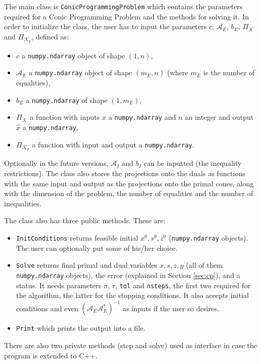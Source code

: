 \documentclass[paper=a4, fontsize=11pt]{scrartcl}
\numberwithin{equation}{section}		%
\numberwithin{figure}{section}			%
\numberwithin{table}{section}				%
\begin{document}
The main class is \texttt{ConicProgrammingProblem} which contains the parameters required for a Conic Programming Problem and the methods for solving it. In order to initialize the class, the user has to input the parameters $c$, $\mathcal{A}_E$, $b_E$, $\Pi_{\mathcal{K}}$ and $\Pi_{\mathcal{K}_p}$, defined as:

\begin{itemize}
\item $c$ a \texttt{numpy.ndarray} object of shape $(1,n)$,
\item $\mathcal{A}_E$ a \texttt{numpy.ndarray} object of shape $(m_E,n)$ (where $m_E$ is the number of equalities),
\item $b_E$ a \texttt{numpy.ndarray} of shape $(1,m_E)$,
\item $\Pi_{\mathcal{K}}$ a function with inputs $x$ a \texttt{numpy.ndarray} and $n$ an integer and output \\$\hat{x}$ a \texttt{numpy.ndarray},
\item $\Pi_{\mathcal{K}_p}$ a function with input and output a \texttt{numpy.ndarray}.
\end{itemize}

Optionally in the future versions, $\mathcal{A}_I$ and $b_I$ can be inputted (the inequality restrictions).
The class also stores the projections onto the duals as functions with the same input and output as the projections onto the primal cones, along with the dimension of the problem, the number of equalities and the number of inequalities.

The class also has three public methods. These are:
\begin{itemize}
\item \texttt{InitConditions} returns feasible initial $x^0,s^0,z^0$ (\texttt{numpy.ndarray} objects). The user can optionally put some of his/her choice.
\item \texttt{Solve} returns final primal and dual variables $x,s,z,y$ (all of them \texttt{numpy.ndarray} objects), the error (explained in Section \ref{sec:cp}), and a status. It needs parameters $\sigma$, $\tau$, \texttt{tol} and \texttt{nsteps}, the first two required for the algorithm, the latter for the stopping conditions. It also accepts initial conditions and even $(\mathcal{A}_E\mathcal{A}_E^*)^{-1}$ as inputs if the user so desires.
\item \texttt{Print} which prints the output into a file.
\end{itemize}

There are also two private methods (step and solve) used as interface in case the program is extended to C++.
\end{document}
